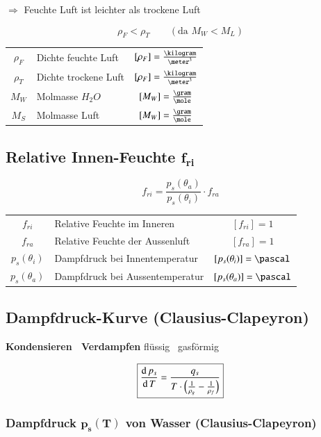$\Rightarrow$ Feuchte Luft ist leichter als trockene Luft

$$ \boxed{ \rho_F < \rho_T } \qquad (\text{da } M_W < M_L) $$

\renewcommand{\arraystretch}{1.3}
\begin{tabular}{c l c}
	$\rho_F$	& Dichte feuchte Luft 	& $[\rho_F] = \frac{\kilogram}{\meter^3}$	\\
	$\rho_T$	& Dichte trockene Luft 	& $[\rho_F] = \frac{\kilogram}{\meter^3}$	\\
	$M_W$ 		& Molmasse $H_2O$ 		& $[M_W] = \frac{\gram}{\mole}$ 			\\
	$M_S$ 		& Molmasse Luft 		& $[M_W] = \frac{\gram}{\mole}$
\end{tabular}
\renewcommand{\arraystretch}{1}


\subsection[Relative Innen-Feuchte]{Relative Innen-Feuchte $\boldsymbol{f_{ri}}$}

\vspace{-0.2cm}

$$ \boxed{ f_{ri} = \frac{p_s(\theta_a)}{p_s(\theta_i)} \cdot f_{ra} } $$

\begin{tabular}{c l c}
	$f_{ri}$ 		& Relative Feuchte im Inneren 		& $[f_{ri}] = 1$ 				\\
	$f_{ra}$ 		& Relative Feuchte der Aussenluft 	& $[f_{ra}] = 1$ 				\\
	$p_s(\theta_i)$ & Dampfdruck bei Innentemperatur 	& $[p_s(\theta_i)] = \pascal$ 	\\
	$p_s(\theta_a)$ & Dampfdruck bei Aussentemperatur 	&  $[p_s(\theta_a)] = \pascal$
\end{tabular}

\subsection{Dampfdruck-Kurve (Clausius-Clapeyron)}

\textbf{Kondensieren \textlrarrow\ Verdampfen}  \qquad flüssig \textlrarrow\ gasförmig

$$ \boxed{ \frac{\mathop{} \! \mathrm{d} \, p_s}{\mathop{} \! \mathrm{d} \, T} = \frac{q_s}{T \cdot  \Big( \frac{1}{\rho_g} - \frac{1}{\rho_f} \Big) } } $$


\subsubsection{Dampfdruck $\boldsymbol{p_s(T)}$ von Wasser (Clausius-Clapeyron)}

